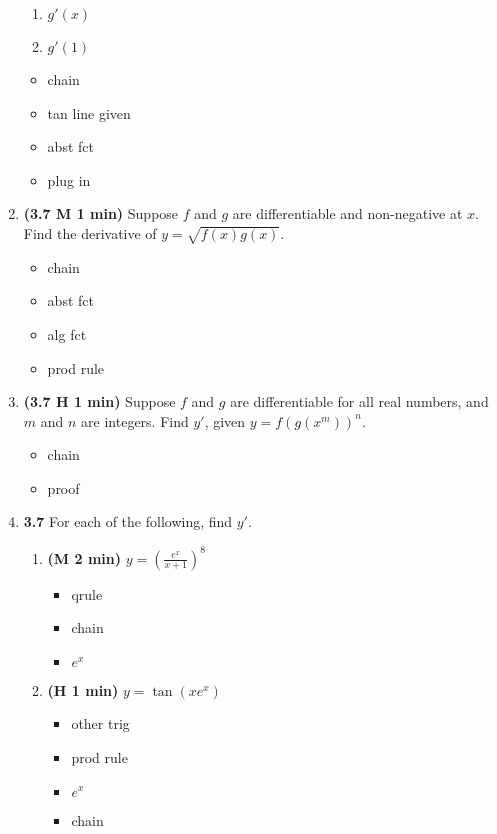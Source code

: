 \documentclass[12pt]{article}
\begin{document}
\begin{enumerate}[1.]
\begin{enumerate}
	\item $g'(x)$
	
	\item $g'(1)$
\end{enumerate}
{\bf\begin{itemize}
\item chain
\item tan line given
\item abst fct
\item plug in
\end{itemize}}

\item {\bf (3.7 M 1 min)} Suppose $f$ and $g$ are differentiable and non-negative at $x$.  Find the derivative of $y=\sqrt{f(x)g(x)}$.
{\bf\begin{itemize}
\item chain
\item abst fct
\item alg fct
\item prod rule
\end{itemize}}

\item {\bf (3.7 H 1 min)} Suppose $f$ and $g$ are differentiable for all real numbers, and $m$ and $n$ are integers.  Find $y'$, given $y=f(g(x^m))^n$.
{\bf\begin{itemize}
\item chain
\item proof
\end{itemize}}

\item {\bf 3.7} For each of the following, find $y'$.
\begin{enumerate}
	\item {\bf (M 2 min)} $y=\left(\displaystyle\frac{e^x}{x+1}\right)^8$
	{\bf\begin{itemize}
\item qrule
\item chain
\item $e^x$
\end{itemize}}

	\item {\bf (H 1 min)} $y=\tan{(xe^x)}$
	{\bf\begin{itemize}
\item other trig
\item prod rule
\item $e^x$
\item chain
\end{itemize}}
	

\end{enumerate}
\end{enumerate}
\end{document}
